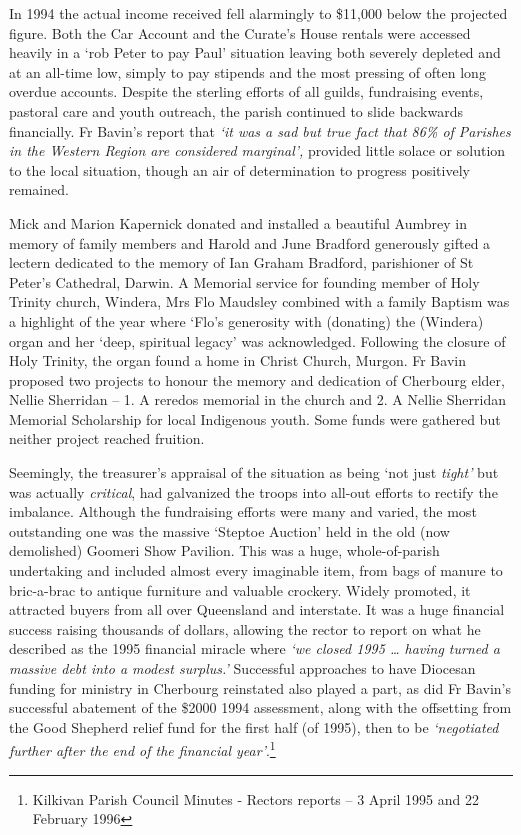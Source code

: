 In 1994 the actual income received fell alarmingly to \$11,000 below the projected figure. Both the Car Account and the Curate's House rentals were accessed heavily in a `rob Peter to pay Paul' situation leaving both severely depleted and at an all-time low, simply to pay stipends and the most pressing of often long overdue accounts. Despite the sterling efforts of all guilds, fundraising events, pastoral care and youth outreach, the parish continued to slide backwards financially. Fr Bavin's report that \emph{`it was a sad but true fact that 86\% of Parishes in the Western Region are considered marginal',} provided little solace or solution to the local situation, though an air of determination to progress positively remained.



Mick and Marion Kapernick donated and installed a beautiful Aumbrey in memory of family members and Harold and June Bradford generously gifted a lectern dedicated to the memory of Ian Graham Bradford, parishioner of St Peter's Cathedral, Darwin. A Memorial service for founding member of Holy Trinity church, Windera, Mrs Flo Maudsley combined with a family Baptism was a highlight of the year where `Flo's generosity with (donating) the (Windera) organ and her `deep, spiritual legacy' was acknowledged. Following the closure of Holy Trinity, the organ found a home in Christ Church, Murgon. Fr Bavin proposed two projects to honour the memory and dedication of Cherbourg elder, Nellie Sherridan -- 1. A reredos memorial in the church and 2. A Nellie Sherridan Memorial Scholarship for local Indigenous youth. Some funds were gathered but neither project reached fruition.



Seemingly, the treasurer's appraisal of the situation as being `not just \emph{tight'} but was actually \emph{critical}, had galvanized the troops into all-out efforts to rectify the imbalance. Although the fundraising efforts were many and varied, the most outstanding one was the massive `Steptoe Auction' held in the old (now demolished) Goomeri Show Pavilion. This was a huge, whole-of-parish undertaking and included almost every imaginable item, from bags of manure to bric-a-brac to antique furniture and valuable crockery. Widely promoted, it attracted buyers from all over Queensland and interstate. It was a huge financial success raising thousands of dollars, allowing the rector to report on what he described as the 1995 financial miracle where \emph{`we closed 1995 \ldots{} having turned a massive debt into a modest surplus.'} Successful approaches to have Diocesan funding for ministry in Cherbourg reinstated also played a part, as did Fr Bavin's successful abatement of the \$2000 1994 assessment, along with the offsetting from the Good Shepherd relief fund for the first half (of 1995), then to be \emph{`negotiated further after the end of the financial year'}.\footnote{Kilkivan Parish Council Minutes - Rectors reports -- 3 April 1995 and 22 February 1996}


